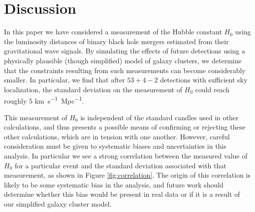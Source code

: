 \section{Discussion} \label{sec:conclusions}

In this paper we have considered a measurement of the Hubble constant $H_0$ using the luminosity distances of binary black hole mergers estimated from their gravitational wave signals.
By simulating the effects of future detections using a physically plausible (though simplified) model of galaxy clusters, we determine that the constraints resulting from such measurements can become considerably smaller.
In particular, we find that after $53 + 4 - 2$ detections with sufficient sky localization, the standard deviation on the measurement of $H_0$ could reach roughly $5$ \si{km.s^{-1}.Mpc^{-1}}.

This measurement of $H_0$ is independent of the standard candles used in other calculations, and thus presents a possible means of confirming or rejecting these other calculations, which are in tension with one another.
However, careful consideration must be given to systematic biases and uncertainties in this analysis.
In particular we see a strong correlation between the measured value of $H_0$ for a particular event and the standard deviation associated with that measurement, as shown in Figure \ref{fig:correlation}.
The origin of this correlation is likely to be some systematic bias in the analysis, and future work should determine whether this bias would be present in real data or if it is a result of our simplified galaxy cluster model.





